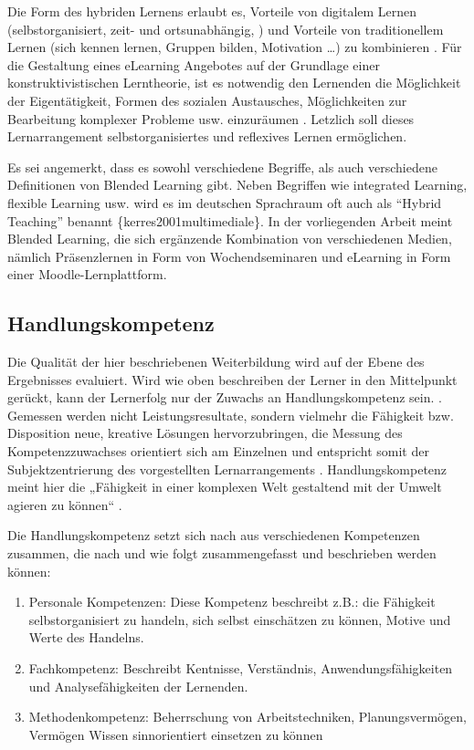 \documentclass[12pt, bibliography=totoc]{scrartcl}
\begin{document}
Die Form des hybriden Lernens erlaubt es, Vorteile von digitalem Lernen
(selbstorganisiert, zeit- und ortsunabhängig, ) und Vorteile von
traditionellem Lernen (sich kennen lernen, Gruppen bilden, Motivation
\ldots) zu kombinieren \parencite{Zumbach2010}. Für die Gestaltung eines
eLearning Angebotes auf der Grundlage einer konstruktivistischen
Lerntheorie, ist es notwendig den Lernenden die Möglichkeit der
Eigentätigkeit, Formen des sozialen Austausches, Möglichkeiten zur
Bearbeitung komplexer Probleme usw. einzuräumen
. Letzlich soll dieses Lernarrangement
selbstorganisiertes und reflexives Lernen ermöglichen.

Es sei angemerkt, dass es sowohl verschiedene Begriffe, als auch
verschiedene Definitionen von Blended Learning gibt. Neben Begriffen wie
integrated Learning, flexible Learning usw. wird es im deutschen
Sprachraum oft auch als \enquote{Hybrid Teaching} benannt
\parencite{Oliver2005}\{kerres2001multimediale\}. In der vorliegenden
Arbeit meint Blended Learning, die sich ergänzende Kombination von
verschiedenen Medien, nämlich Präsenzlernen in Form von Wochendseminaren
und eLearning in Form einer Moodle-Lernplattform.

\subsection{Handlungskompetenz}\label{handlungskompetenz}

Die Qualität der hier beschriebenen Weiterbildung wird auf der Ebene des
Ergebnisses evaluiert. Wird wie oben beschreiben der Lerner in den
Mittelpunkt gerückt, kann der Lernerfolg nur der Zuwachs an
Handlungskompetenz sein. \parencite[4]{Ehlers2002}. Gemessen werden
nicht Leistungsresultate, sondern vielmehr die Fähigkeit bzw.
Disposition neue, kreative Lösungen hervorzubringen, die Messung des
Kompetenzzuwachses orientiert sich am Einzelnen und entspricht somit der
Subjektzentrierung des vorgestellten Lernarrangements
\parencite{ErpenbeckRosenstiel200305}. Handlungskompetenz meint hier die
„Fähigkeit in einer komplexen Welt gestaltend mit der Umwelt agieren zu
können`` \parencite[4]{Ehlers2002}.

Die Handlungskompetenz setzt sich nach
\textcite{ErpenbeckRosenstiel200305} aus verschiedenen Kompetenzen
zusammen, die nach \textcite{ErpenbeckRosenstiel200305} und
\autocite{Braun2008} wie folgt zusammengefasst und beschrieben werden
können:

\begin{enumerate}
\def\labelenumi{\arabic{enumi}.}
\item
  Personale Kompetenzen: Diese Kompetenz beschreibt z.B.: die Fähigkeit
  selbstorganisiert zu handeln, sich selbst einschätzen zu können,
  Motive und Werte des Handelns.
\item
  Fachkompetenz: Beschreibt Kentnisse, Verständnis,
  Anwendungsfähigkeiten und Analysefähigkeiten der Lernenden.
\item
  Methodenkompetenz: Beherrschung von Arbeitstechniken,
  Planungsvermögen, Vermögen Wissen sinnorientiert einsetzen zu können
\end{enumerate}
\end{document}
